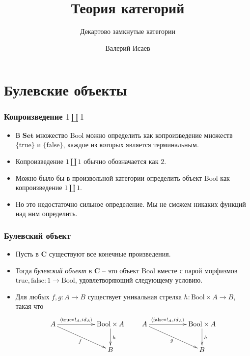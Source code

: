 \documentclass{beamer}
\theoremstyle{definition}
\newcommand{\cat}[1]{\mathbf{#1}}
\renewcommand{\C}{\cat{C}}
\newcommand{\Set}{\cat{Set}}
\newcommand{\bool}{\mathrm{Bool}}
\newcommand{\true}{\mathrm{true}}
\newcommand{\false}{\mathrm{false}}
\begin{document}
\title{Теория категорий}
\subtitle{Декартово замкнутые категории}
\author{Валерий Исаев}
\maketitle

\section{Булевские объекты}

\begin{frame}
\frametitle{Копроизведение $1 \amalg 1$}
\begin{itemize}
\item В $\Set$ множество $\bool$ можно определить как копроизведение множеств $\{ \true \}$ и $\{ \false \}$, каждое из которых является терминальным.
\item Копроизведение $1 \amalg 1$ обычно обозначается как $2$.
\item Можно было бы в произвольной категории определить объект $\bool$ как копроизведение $1 \amalg 1$.
\item Но это недостаточно сильное определение. Мы не сможем никаких функций над ним определить.
\end{itemize}
\end{frame}

\begin{frame}
\frametitle{Булевский объект}
\begin{itemize}
\item Пусть в $\C$ существуют все конечные произведения.
\item Тогда \emph{булевский объект} в $\C$ -- это объект $\bool$ вместе с парой морфизмов $\true, \false : 1 \to \bool$, удовлетворяющий следующему условию.
\item Для любых $f, g : A \to B$ существует уникальная стрелка $h : \bool \times A \to B$, такая что
\[ \xymatrix{ A \ar[rr]^-{\langle \true \circ !_A, id_A \rangle} \ar[drr]_{f} & & \bool \times A \ar[d]^h \\
                                                                             & & B
            }
\qquad \xymatrix{ A \ar[rr]^-{\langle \false \circ !_A, id_A \rangle} \ar[drr]_{g} & & \bool \times A \ar[d]^h \\
                                                                              & & B
            }
\]
\end{itemize}
\end{frame}
\end{document}

